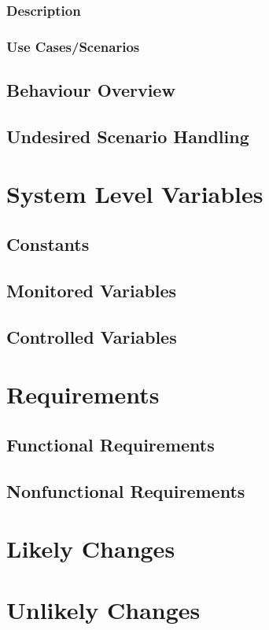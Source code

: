 \documentclass[12pt]{article}
\begin{document}
\subsubsection{Description}
\subsubsection{Use Cases/Scenarios}

\subsection{Behaviour Overview}
\subsection{Undesired Scenario Handling}

\section{System Level Variables}
\subsection{Constants}
\subsection{Monitored Variables}
\subsection{Controlled Variables}

\section{Requirements}
\subsection{Functional Requirements}
\subsection{Nonfunctional Requirements}

\section{Likely Changes}
\section{Unlikely Changes}
\end{document}

